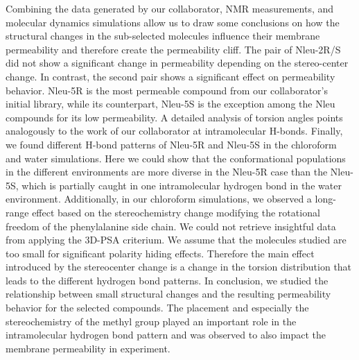 Combining the data generated by our collaborator, NMR measurements, and molecular dynamics simulations allow us to draw some conclusions on how the structural changes in the sub-selected molecules influence their membrane permeability and therefore create the permeability cliff. 
The pair of Nleu-2R/S did not show a significant change in permeability depending on the stereo-center change. In contrast, the second pair shows a significant effect on permeability behavior. Nleu-5R is the most permeable compound from our collaborator's initial library, while its counterpart, Nleu-5S is the exception among the Nleu compounds for its low permeability. 
A detailed analysis of torsion angles points analogously to the work of our collaborator at intramolecular H-bonds.  \cite{Comeau2021}
Finally, we found different H-bond patterns of Nleu-5R and Nleu-5S in the chloroform and water simulations.  Here we could show that the conformational populations in the different environments are more diverse in the Nleu-5R case than the Nleu-5S, which is partially caught in one intramolecular hydrogen bond in the water environment.
Additionally, in our chloroform simulations, we observed a long-range effect based on the stereochemistry change modifying the rotational freedom of the phenylalanine side chain.
We could not retrieve insightful data from applying the 3D-PSA criterium. We assume that the molecules studied are too small for significant polarity hiding effects.  Therefore the main effect introduced by the stereocenter change is a change in the torsion distribution that leads to the different hydrogen bond patterns.
In conclusion, we studied the relationship between small structural changes and the resulting permeability behavior for the selected compounds. The placement and especially the stereochemistry of the methyl group played an important role in the intramolecular hydrogen bond pattern and was observed to also impact the membrane permeability in experiment.
